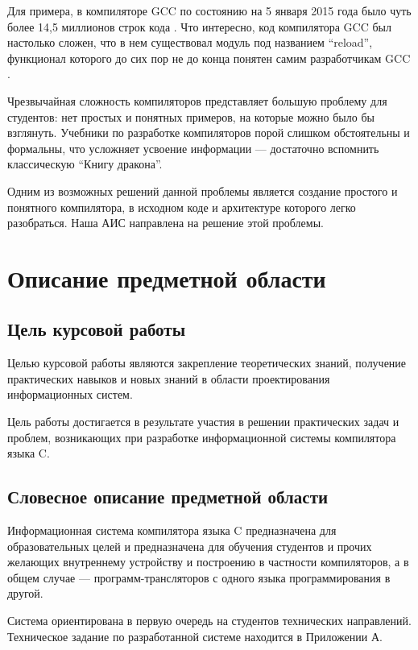\documentclass[14pt,russian]{extarticle}
\begin{document}
Для примера, в компиляторе GCC по состоянию на 5 января 2015 года было чуть
более 14,5 миллионов строк кода \cite{gcc1}. Что интересно, код компилятора GCC
был настолько сложен, что в нем существовал модуль под названием ``reload'',
функционал которого до сих пор не до конца понятен самим разработчикам GCC
\cite{gcc2}.

Чрезвычайная сложность компиляторов представляет большую проблему для студентов:
нет простых и понятных примеров, на которые можно было бы взглянуть. Учебники по
разработке компиляторов порой слишком обстоятельны и формальны, что усложняет
усвоение информации --- достаточно вспомнить классическую ``Книгу дракона''.

Одним из возможных решений данной проблемы является создание простого и
понятного компилятора, в исходном коде и архитектуре которого легко разобраться.
Наша АИС направлена на решение этой проблемы.

\clearpage
\section{Описание предметной области}

\subsection{Цель курсовой работы}

Целью курсовой работы являются закрепление теоретических знаний, получение
практических навыков и новых знаний в области проектирования информационных
систем.

Цель работы достигается в результате участия в решении практических задач и
проблем, возникающих при разработке информационной системы компилятора языка C.

\subsection{Словесное описание предметной области}

Информационная система компилятора языка C предназначена для образовательных
целей и предназначена для обучения студентов и прочих желающих внутреннему
устройству и построению в частности компиляторов, а в общем случае ---
программ-трансляторов с одного языка программирования в другой.

Система ориентирована в первую очередь на студентов технических направлений.
Техническое задание по разработанной системе находится в Приложении А.
\end{document}
